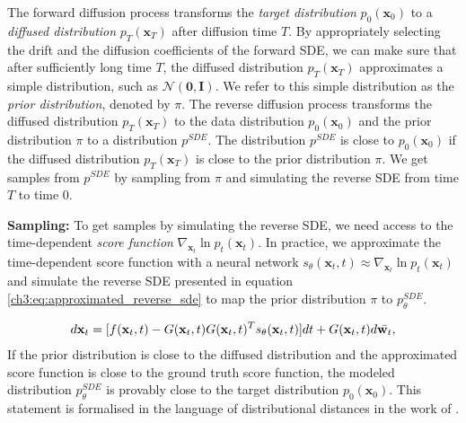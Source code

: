 The forward diffusion process transforms the \textit{target distribution} $p_0(\textbf{x}_0)$ to a \textit{diffused distribution} $p_T(\textbf{x}_T)$ after diffusion time $T$. By appropriately selecting the drift and the diffusion coefficients of the forward SDE, we can make sure that after sufficiently long time $T$, the diffused distribution $p_T(\textbf{x}_T)$ approximates a simple distribution, such as $\mathcal{N}(\textbf{0},\textbf{I})$. We refer to this simple distribution as the \textit{prior distribution}, denoted by $\pi$. The reverse diffusion process transforms the diffused distribution $p_T(\textbf{x}_T)$ to the data distribution $p_0(\textbf{x}_0)$ and the prior distribution $\pi$ to a distribution $p^{SDE}$. The distribution $p^{SDE}$ is close to $p_0(\textbf{x}_0)$ if the diffused distribution $p_T(\textbf{x}_T)$ is close to the prior distribution $\pi$. We get samples from $p^{SDE}$ by sampling from $\pi$ and simulating the reverse SDE from time $T$ to time $0$.

\textbf{Sampling:} To get samples by simulating the reverse SDE, we need access to the time-dependent \textit{score function} $\nabla_{\textbf{x}_t}{\ln{p_t(\textbf{x}_t)}}$. In practice, we approximate the time-dependent score function with a neural network $s_{\theta}(\textbf{x}_t,t) \approx \nabla_{\textbf{x}_t}{\ln{p_t(\textbf{x}_t)}}$ and simulate the reverse SDE presented in equation \ref{ch3:eq:approximated_reverse_sde} to map the prior distribution $\pi$ to $p^{SDE}_{\theta}$.

\begin{gather}\label{ch3:eq:approximated_reverse_sde}
d\textbf{x}_t=[f(\textbf{x}_t,t)-G(\textbf{x}_t,t)G(\textbf{x}_t,t)^Ts_{\theta}(\textbf{x}_t,t)]dt + G(\textbf{x}_t,t)d\Bar{\textbf{w}_t},
\end{gather}If the prior distribution is close to the diffused distribution and the approximated score function is close to the ground truth score function, the modeled distribution  $p^{SDE}_{\theta}$ is provably close to the target distribution $p_0(\textbf{x}_0)$. This statement is formalised in the language of distributional distances in the work of \cite{song2021maximum}. 



